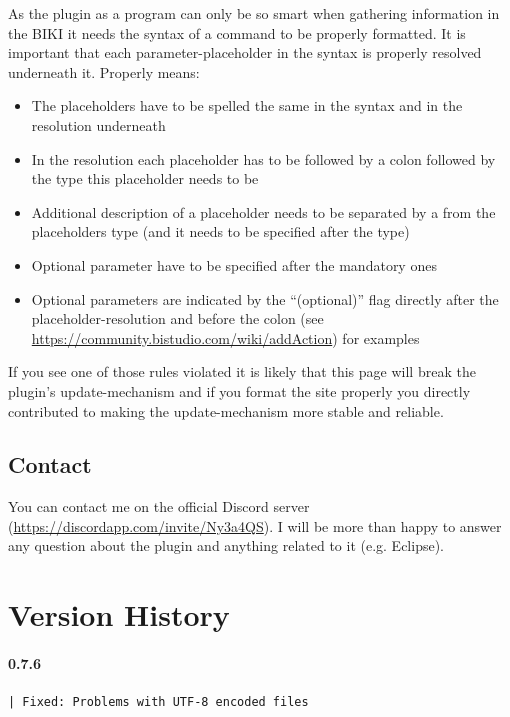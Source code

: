\documentclass[twoside=false]{scrbook}
\newcommand{\eclipse}{Eclipse\xspace}
\begin{document}
	As the plugin as a program can only be so smart when gathering information in the BIKI it needs the syntax of a command to be properly formatted. It is important that each parameter-placeholder in the syntax is properly resolved underneath it. Properly means:
	\begin{itemize}
		\item The placeholders have to be spelled the same in the syntax and in the resolution underneath
		\item In the resolution each placeholder has to be followed by a colon followed by the type this placeholder needs to be
		\item Additional description of a placeholder needs to be separated by a \keys{-} from the placeholders type (and it needs to be specified after the type)
		\item Optional parameter have to be specified after the mandatory ones
		\item Optional parameters are indicated by the “(optional)” flag directly after the placeholder-resolution and before the colon (see \url{https://community.bistudio.com/wiki/addAction}) for examples
	\end{itemize}
	
	If you see one of those rules violated it is likely that this page will break the plugin's update-mechanism and if you format the site properly you directly contributed to making the update-mechanism more stable and reliable.

	
	\section{Contact}
	\label{sec:Contact}
	You can contact me on the official Discord server (\url{https://discordapp.com/invite/Ny3a4QS}). I will be more than happy to answer any question about the plugin and anything related to it (e.g. \eclipse).
	
	
	
	\chapter{Version History}
	\label{ch:VersionHistory}
	
	\subsubsection*{0.7.6}
	\begin{lstlisting}[breaklines=true]
| Fixed: Problems with UTF-8 encoded files
	\end{lstlisting}
	
\end{document}
